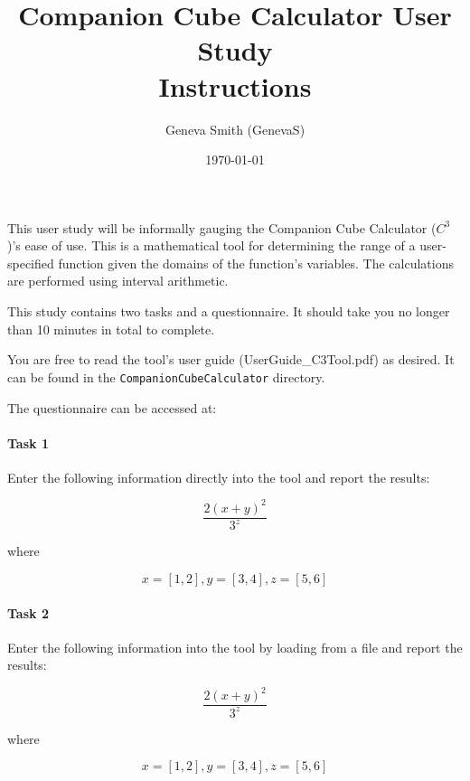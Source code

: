 \documentclass[12pt]{article}
\title{Companion Cube Calculator User Study \\ Instructions}
\author{Geneva Smith (GenevaS)}
\date{\today}
\begin{document}
\maketitle

This user study will be informally gauging the Companion Cube Calculator 
($C^3$)'s ease of use. This is a mathematical tool for determining the range of 
a user-specified function given the domains of the function's variables. The 
calculations are performed using interval arithmetic.

This study contains two tasks and a questionnaire. It should take you no longer 
than 10 minutes in total to complete. 

You are free to read the tool's user guide (UserGuide\_C3Tool.pdf) as desired. 
It can be found in the 
\texttt{CompanionCubeCalculator} directory.

The questionnaire can be accessed at:
\begin{center}

\end{center}

\paragraph{Task 1\\}
Enter the following information directly into the tool and report the results:

$$\frac{2(x + y)^2}{3^z}$$

where

$$x = [1, 2], y = [3, 4], z = [5, 6]$$

\paragraph{Task 2\\}
Enter the following information into the tool by loading from a file and report 
the results:

$$\frac{2(x + y)^2}{3^z}$$

where

$$x = [1, 2], y = [3, 4], z = [5, 6]$$
\end{document}
